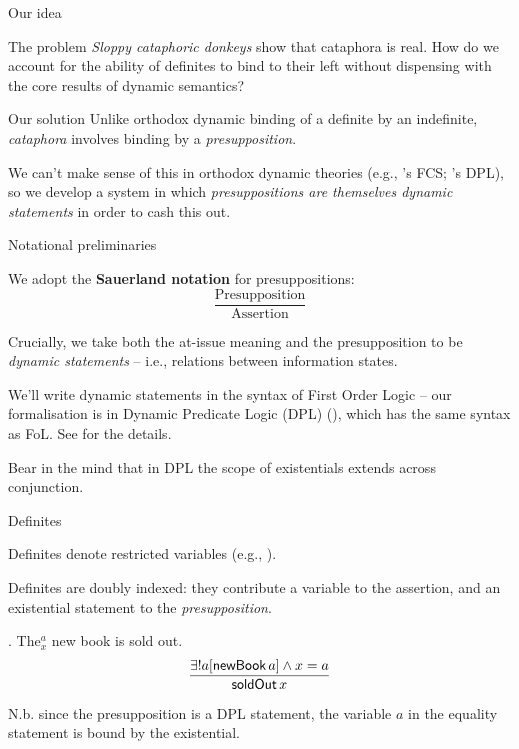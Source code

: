 \documentclass{beamer}
\begin{document}
\begin{frame}{Our idea}

  \begin{block}{The problem}
    \textit{Sloppy cataphoric donkeys} show that cataphora is real.
    How do we account for the ability of definites to bind to their left without dispensing with the core results of dynamic semantics?
  \end{block}

  \begin{block}{Our solution}
Unlike orthodox dynamic binding of a definite by an indefinite, \textit{cataphora} involves binding by a \textit{presupposition}.

We can't make sense of this in orthodox dynamic theories (e.g., \citeauthor{heim1982}'s FCS; \citeauthor{groenendijk_dynamic_1991}'s DPL), so we develop a system in which \textit{presuppositions are themselves dynamic statements} in order to cash this out.
  \end{block}

\end{frame}

\begin{frame}{Notational preliminaries}

We adopt the {\bf Sauerland notation} for presuppositions:
$$\displaystyle\frac{\text{Presupposition}}{\text{Assertion}}$$

Crucially, we take both the at-issue meaning and the presupposition to be \textit{dynamic statements} -- i.e., relations between information states.

We'll write dynamic statements in the syntax of First Order Logic -- our formalisation is in Dynamic Predicate Logic (DPL) (\citealt{groenendijk_dynamic_1991}), which has the same syntax as FoL. See \citet{elliottSudoLenls,elliottSudoCat} for the details.

Bear in the mind that in DPL the scope of existentials extends across conjunction.

\end{frame}

\begin{frame}{Definites}

  \begin{description}

    \item[Orthodox theories]
      Definites denote restricted variables (e.g., \citealt{heim1982}).

      \item[Our theory]
      Definites are doubly indexed: they contribute a variable to the assertion, and an existential statement to the \textit{presupposition}.

  \end{description}

  \ex. The$^a_x$ new book is sold out.
  $$\displaystyle\frac{\exists ! a[\textsf{newBook}\,a] \wedge x = a}{\textsf{soldOut}\,x}$$

  N.b. since the presupposition is a DPL statement, the variable \(a\) in the equality statement is bound by the existential.

\end{frame}
\end{document}
